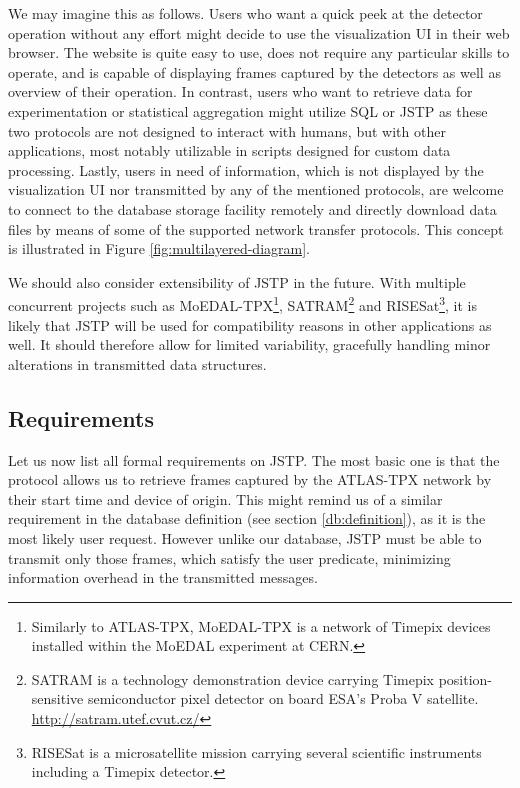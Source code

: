 We may imagine this as follows. Users who want a quick peek at the detector operation without any effort might decide to use the visualization UI in their web browser. The website is quite easy to use, does not require any particular skills to operate, and is capable of displaying frames captured by the detectors as well as overview of their operation. In contrast, users who want to retrieve data for experimentation or statistical aggregation might utilize SQL or JSTP as these two protocols are not designed to interact with humans, but with other applications, most notably utilizable in scripts designed for custom data processing. Lastly, users in need of information, which is not displayed by the visualization UI nor transmitted by any of the mentioned protocols, are welcome to connect to the database storage facility remotely and directly download data files by means of some of the supported network transfer protocols. This concept is illustrated in Figure \ref{fig:multilayered-diagram}.

We should also consider extensibility of JSTP in the future. With multiple concurrent projects such as MoEDAL-TPX\footnote{Similarly to ATLAS-TPX, MoEDAL-TPX is a network of Timepix devices installed within the MoEDAL experiment at CERN.}, SATRAM\footnote{SATRAM is a technology demonstration device carrying Timepix position-sensitive semiconductor pixel detector on board ESA’s Proba V satellite. \url{http://satram.utef.cvut.cz/}} and RISESat\footnote{RISESat is a microsatellite mission carrying several scientific instruments including a Timepix detector.}, it is likely that JSTP will be used for compatibility reasons in other applications as well. It should therefore allow for limited variability, gracefully handling minor alterations in transmitted data structures.

\subsection{Requirements}
Let us now list all formal requirements on JSTP. The most basic one is that the protocol allows us to retrieve frames captured by the ATLAS-TPX network by their start time and device of origin. This might remind us of a similar requirement in the database definition (see section \ref{db:definition}), as it is the most likely user request. However unlike our database, JSTP must be able to transmit only those frames, which satisfy the user predicate, minimizing information overhead in the transmitted messages.

